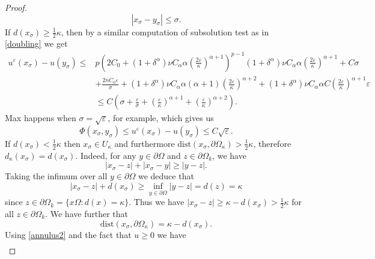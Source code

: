 \documentclass[11pt,reqno]{amsart}
\numberwithin{figure}{section}
\theoremstyle{plain}
\theoremstyle{remark}
\numberwithin{equation}{section}
\begin{document}
\begin{proof}
\begin{equation*}
    \left| x_\sigma - y_\sigma \right| \leq \sigma.  
\end{equation*}
If $ d(x_\sigma) \geq \frac{1}{2}\kappa$, then by a similar  computation of subsolution test as in \eqref{doubling} we get 
\begin{align*}
     u^\varepsilon(x_\sigma) - u(y_\sigma) \leq & p\left(2C_0+(1+\delta^\alpha)\nu C_\alpha \alpha\left( \frac{2\varepsilon}{\kappa}\right)^{\alpha+1}\right)^{p-1}(1+\delta^\alpha) \nu C_\alpha \alpha \left(\frac{2\varepsilon}{\kappa}\right)^{\alpha+1} + C\sigma\nonumber\\
    &+\frac{2nC_0\varepsilon}{\sigma} + (1+\delta^\alpha)\nu C_\alpha \alpha(\alpha+1)\left(\frac{2\varepsilon}{\kappa}\right)^{\alpha+2} + (1+\delta^\alpha)\nu C_\alpha \alpha C \left(\frac{2\varepsilon}{\kappa}\right)^{\alpha+1}\varepsilon\nonumber\\
    &\leq C\left(\sigma + \frac{\varepsilon}{\sigma} + \left(\frac{\varepsilon}{\kappa}\right)^{\alpha+1} + \left(\frac{\varepsilon}{\kappa}\right)^{\alpha+2} \right).
\end{align*}
Max happens when $\sigma = \sqrt{\varepsilon}$, for example, which gives us  
\begin{equation}\label{e:final1}
    \Phi(x_\sigma,y_\sigma) \leq u^\varepsilon(x_\sigma) - u(y_\sigma) \leq C\sqrt{\varepsilon}.
\end{equation}
If $d(x_\sigma) < \frac{1}{2}\kappa$ then $x_\sigma \in U_\kappa$ and furthermore $\mathrm{dist}(x_\sigma,\partial \Omega_\kappa) > \frac{1}{2}\kappa$, therefore $d_\kappa(x_\sigma) = d(x_\sigma)$. Indeed, for any $y\in\partial\Omega$ and $z\in \partial\Omega_k$, we have
\begin{equation*}
    |x_\sigma - z| + |x_\sigma - y| \geq |y-z|.
\end{equation*}
Taking the infimum over all $y\in \partial\Omega$ we deduce that
\begin{equation*}
    |x_\sigma - z| + d(x_\sigma) \geq \inf_{y\in \partial \Omega}|y-z| = d(z) = \kappa
\end{equation*}
since $z\in \partial\Omega_k = \{x\Omega: d(x) = \kappa\}$. Thus we have $|x_\sigma - z| \geq \kappa - d(x_\sigma) > \frac{1}{2}\kappa$ for all $z\in \partial\Omega_k$. We have further that
\begin{equation*}
    \mathrm{dist}(x_\sigma,\partial\Omega_\kappa) = \kappa - d(x_\sigma).
\end{equation*}
Using \eqref{annulus2} and the fact that $u \geq 0$ we have
\begin{align}

\end{align}
\end{proof}
\end{document}
